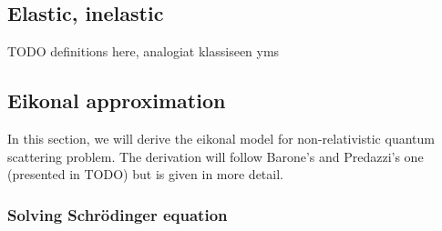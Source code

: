 \documentclass[a4paper, twoside, english, 12pt]{article}
\begin{document}
\subsection{Elastic, inelastic}

TODO definitions here, analogiat klassiseen yms


\subsection{Eikonal approximation}\label{S:Eikonal_approximation}


In this section, we will derive the eikonal model for non-relativistic quantum scattering problem. The derivation will follow Barone's and Predazzi's one (presented in TODO) but is given in more detail.


\subsubsection{Solving Schrödinger equation}\label{SS:schrode}
\end{document}
